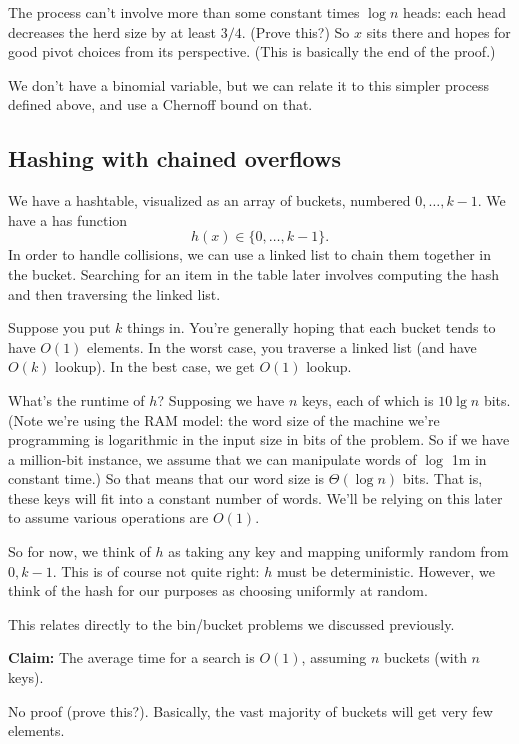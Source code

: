\documentclass{article}
\begin{document}
The process can't involve more than some constant times $\log n$ heads:
each head decreases the herd size by at least $3/4$.
(Prove this?)
So $x$ sits there and hopes for good pivot choices from its perspective.
(This is basically the end of the proof.)

We don't have a binomial variable, but we can relate it to this
simpler process defined above, and use a Chernoff bound on that.


\subsection{Hashing with chained overflows}

We have a hashtable, visualized as an array of buckets, numbered $0,\ldots,k-1$.
We have a has function
$$
h(x) \in \{0,\ldots,k-1\}.
$$
In order to handle collisions, we can use a linked list to chain
them together in the bucket.
Searching for an item in the table later involves computing the hash and
then traversing the linked list.

Suppose you put $k$ things in.
You're generally hoping that each bucket tends to have $O(1)$ elements.
In the worst case, you traverse a linked list (and have $O(k)$ lookup).
In the best case, we get $O(1)$ lookup.

What's the runtime of $h$?
Supposing we have $n$ keys, each of which is $10\lg n$ bits.
(Note we're using the RAM  model: the word size of the machine we're
programming is logarithmic in the input size in bits of the problem.
So if we have a million-bit instance, we assume that we can manipulate
words of $\log$ 1m in constant time.)
So that means that our word size is $\Theta(\log n)$ bits.
That is, these keys will fit into a constant number of words.
We'll be relying on this later to assume various operations are $O(1)$.

So for now, we think of $h$ as taking any key and mapping uniformly
random from $0,k-1$.
This is of course not quite right: $h$ must be deterministic.
However, we think of the hash for our purposes as choosing uniformly
at random.

This relates directly to the bin/bucket problems we discussed previously.

\textbf{Claim:}
The average time for a search is $O(1)$, assuming $n$ buckets (with $n$ keys).

No proof (prove this?).
 Basically, the vast majority of buckets will get very few elements.
\end{document}

